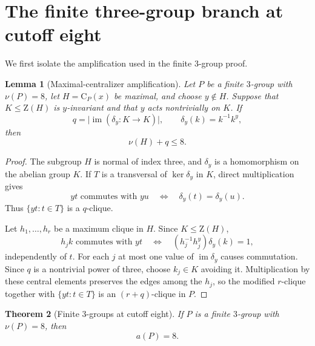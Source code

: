 \documentclass[11pt]{article}
\newtheorem{theorem}{Theorem}[section]
\newtheorem{lemma}[theorem]{Lemma}
\theoremstyle{remark}
\newcommand{\nuG}{\nu}
\newcommand{\aG}{a}
\newcommand{\Z}{\mathrm Z}
\newcommand{\CG}{\mathrm C}
\begin{document}
\section{The finite three-group branch at cutoff eight}

We first isolate the amplification used in the finite $3$-group proof.

\begin{lemma}[Maximal-centralizer amplification]
\label{lem:three-amplification}
Let $P$ be a finite $3$-group with $\nuG(P)=8$, let
$H=\CG_P(x)$ be maximal, and choose $y\notin H$.  Suppose that
$K\le\Z(H)$ is $y$-invariant and that $y$ acts nontrivially on $K$.  If
\[
 q=\bigl|\operatorname{im}(\delta_y:K\longrightarrow K)\bigr|,
 \qquad \delta_y(k)=k^{-1}k^y,
\]
then
\begin{equation}
 \nuG(H)+q\le8.
\label{eq:three-amplification}
\end{equation}
\end{lemma}

\begin{proof}
The subgroup $H$ is normal of index three, and $\delta_y$ is a homomorphism
on the abelian group $K$.  If $T$ is a transversal of
$\ker\delta_y$ in $K$, direct multiplication gives
\[
 yt\text{ commutes with }yu
 \quad\Longleftrightarrow\quad
 \delta_y(t)=\delta_y(u).
\]
Thus $\{yt:t\in T\}$ is a $q$-clique.

Let $h_1,\ldots,h_r$ be a maximum clique in $H$.  Since $K\le\Z(H)$,
\[
 h_jk\text{ commutes with }yt
 \quad\Longleftrightarrow\quad
 (h_j^{-1}h_j^y)\delta_y(k)=1,
\]
independently of $t$.  For each $j$ at most one value of
$\operatorname{im}\delta_y$ causes commutation.  Since $q$ is a nontrivial
power of three, choose $k_j\in K$ avoiding it.  Multiplication by these
central elements preserves the edges among the $h_j$, so the modified
$r$-clique together with $\{yt:t\in T\}$ is an $(r+q)$-clique in $P$.
\end{proof}

\begin{theorem}[Finite $3$-groups at cutoff eight]
\label{thm:three-group-cutoff-eight}
If $P$ is a finite $3$-group with $\nuG(P)=8$, then
\[
 \aG(P)=8.
\]
\end{theorem}
\end{document}
